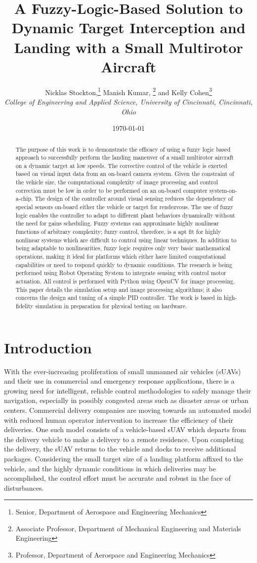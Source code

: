 \documentclass[]{aiaa-tc}
\author{
  Nicklas Stockton,\thanks{Senior, Department of Aerospace and Engineering Mechanics}\quad
  Manish Kumar, \thanks{Associate Professor, Department of Mechanical Engineering and Materials Engineering}\quad
    and Kelly Cohen\thanks{ Professor, Department of Aerospace and Engineering Mechanics}\\
    {\normalsize\itshape
     College of Engineering and Applied Science, University of Cincinnati, Cincinnati, Ohio}}
\title{A Fuzzy-Logic-Based Solution to Dynamic Target Interception and Landing with a Small Multirotor Aircraft}
\date{\today}
\begin{document}
\maketitle
\begin{abstract}
The purpose of this work is to demonstrate the efficacy of using a fuzzy logic based approach to successfully perform the landing maneuver of a small multirotor aircraft on a dynamic target at low speeds. The corrective control of the vehicle is exerted based on visual input data from an on-board camera system. Given the constraint of the vehicle size, the computational complexity of image processing and control correction must be low in order to be performed on an on-board computer system-on-a-chip. The design of the controller around visual sensing reduces the dependency of special sensors on-board either the vehicle or target for rendezvous. The use of fuzzy logic enables the controller to adapt to different plant behaviors dynamically without the need for gains scheduling. Fuzzy systems can approximate highly nonlinear functions of arbitrary complexity; fuzzy control, therefore, is a apt fit for highly nonlinear systems which are difficult to control using linear techniques. In addition to being adaptable to nonlinearities, fuzzy logic requires only very basic mathematical operations, making it ideal for platforms which either have limited computational capabilities or need to respond quickly to dynamic conditions. The research is being performed using Robot Operating System to integrate sensing with control motor actuation. All control is performed with Python using OpenCV for image processing. This paper details the simulation setup and image processing algorithms; it also concerns the design and tuning of a simple PID controller. The work is based in high-fidelity simulation in preparation for physical testing on hardware. 
\end{abstract}
\printnomenclature

\section{Introduction}
With the ever-increasing proliferation of small unmanned air vehicles (sUAVs) and their use in commercial and emergency response applications, there is a growing need for intelligent, reliable control methodologies to safely manage their navigation, especially in possibly congested areas such as disaster areas or urban centers. Commercial delivery companies are moving towards an automated model with reduced human operator intervention to increase the efficiency of their deliveries. One such model consists of a vehicle-based sUAV which departs from the delivery vehicle to make a delivery to a remote residence. Upon completing the delivery, the sUAV returns to the vehicle and docks to receive additional packages. Considering the small target size of a landing platform affixed to the vehicle, and the highly dynamic conditions in which deliveries may be accomplished, the control effort must be accurate and robust in the face of disturbances.
\end{document}
